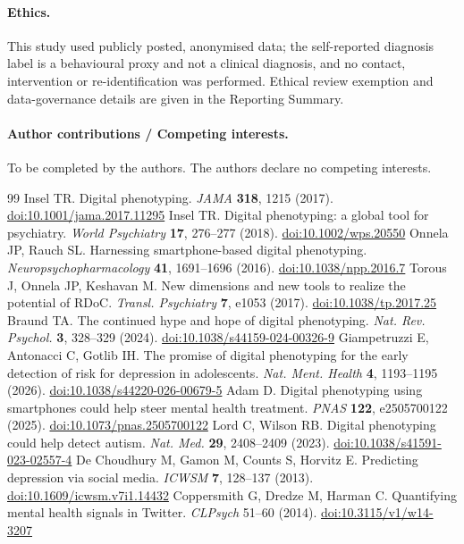 \documentclass[11pt]{article}
\newcommand{\doi}[1]{\href{https://doi.org/#1}{doi:#1}}
\begin{document}
\paragraph*{Ethics.} This study used publicly posted, anonymised data; the self-reported
diagnosis label is a behavioural proxy and not a clinical diagnosis, and no contact,
intervention or re-identification was performed. Ethical review exemption and data-governance
details are given in the Reporting Summary.
\paragraph*{Author contributions / Competing interests.} To be completed by the authors. The
authors declare no competing interests.

\begin{thebibliography}{99}\small
{} Insel TR. Digital phenotyping. \emph{JAMA} \textbf{318}, 1215 (2017). \doi{10.1001/jama.2017.11295}
 Insel TR. Digital phenotyping: a global tool for psychiatry. \emph{World Psychiatry} \textbf{17}, 276--277 (2018). \doi{10.1002/wps.20550}
 Onnela JP, Rauch SL. Harnessing smartphone-based digital phenotyping. \emph{Neuropsychopharmacology} \textbf{41}, 1691--1696 (2016). \doi{10.1038/npp.2016.7}
 Torous J, Onnela JP, Keshavan M. New dimensions and new tools to realize the potential of RDoC. \emph{Transl. Psychiatry} \textbf{7}, e1053 (2017). \doi{10.1038/tp.2017.25}
 Braund TA. The continued hype and hope of digital phenotyping. \emph{Nat. Rev. Psychol.} \textbf{3}, 328--329 (2024). \doi{10.1038/s44159-024-00326-9}
 Giampetruzzi E, Antonacci C, Gotlib IH. The promise of digital phenotyping for the early detection of risk for depression in adolescents. \emph{Nat. Ment. Health} \textbf{4}, 1193--1195 (2026). \doi{10.1038/s44220-026-00679-5}
 Adam D. Digital phenotyping using smartphones could help steer mental health treatment. \emph{PNAS} \textbf{122}, e2505700122 (2025). \doi{10.1073/pnas.2505700122}
 Lord C, Wilson RB. Digital phenotyping could help detect autism. \emph{Nat. Med.} \textbf{29}, 2408--2409 (2023). \doi{10.1038/s41591-023-02557-4}
 De Choudhury M, Gamon M, Counts S, Horvitz E. Predicting depression via social media. \emph{ICWSM} \textbf{7}, 128--137 (2013). \doi{10.1609/icwsm.v7i1.14432}
 Coppersmith G, Dredze M, Harman C. Quantifying mental health signals in Twitter. \emph{CLPsych} 51--60 (2014). \doi{10.3115/v1/w14-3207}

\end{thebibliography}
\end{document}
